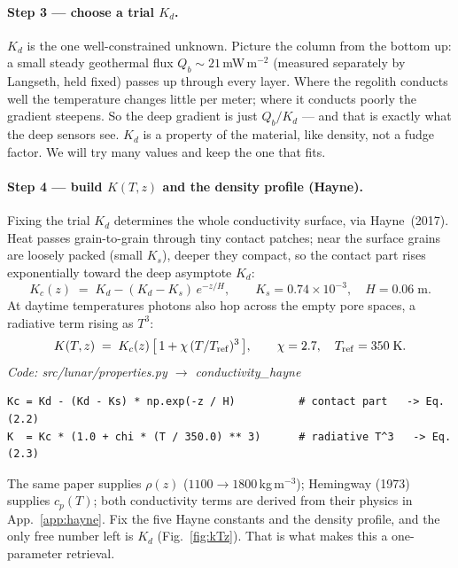 \documentclass[11pt]{report}
\newcommand{\code}[1]{{\ttfamily\small #1}}
\begin{document}
\paragraph{\textbf{Step 3 --- choose a trial $K_d$.}}
$K_d$ is the one well-constrained unknown. Picture the column from the bottom up:
a small steady geothermal flux $Q_b\!\sim\!21$\,mW\,m$^{-2}$ (measured separately
by Langseth, held fixed) passes up through every layer. Where the regolith
conducts well the temperature changes little per meter; where it conducts poorly
the gradient steepens. So the deep gradient is just $Q_b/K_d$ --- and that is
exactly what the deep sensors see. $K_d$ is a property of the material, like
density, not a fudge factor. We will try many values and keep the one that fits.

\paragraph{\textbf{Step 4 --- build $K(T,z)$ and the density profile (Hayne).}}
Fixing the trial $K_d$ determines the whole conductivity surface, via
Hayne~(2017). Heat passes grain-to-grain through tiny contact patches; near the
surface grains are loosely packed (small $K_s$), deeper they compact, so the
contact part rises exponentially toward the deep asymptote $K_d$:
\begin{equation}
K_c(z) \;=\; K_d - (K_d - K_s)\,e^{-z/H},\qquad K_s = 0.74\!\times\!10^{-3},\quad H = 0.06\;\text{m}.
\label{eq:Kc}
\end{equation}
At daytime temperatures photons also hop across the empty pore spaces, a
radiative term rising as $T^3$:
\begin{equation}
K(T,z) \;=\; K_c(z)\,\bigl[\,1 + \chi\,(T/T_{\rm ref})^3\,\bigr],
\qquad \chi = 2.7,\quad T_{\rm ref}=350\;\text{K}.
\label{eq:Khayne}
\end{equation}
{\small\color{dim}\textit{Code: \code{src/lunar/properties.py} $\to$ \code{conductivity\_hayne}}}
\begin{lstlisting}[style=py]
Kc = Kd - (Kd - Ks) * np.exp(-z / H)          # contact part   -> Eq. (2.2)
K  = Kc * (1.0 + chi * (T / 350.0) ** 3)      # radiative T^3   -> Eq. (2.3)
\end{lstlisting}

The same paper supplies $\rho(z)$ ($1100\!\to\!1800$\,kg\,m$^{-3}$); Hemingway
(1973) supplies $c_p(T)$; both conductivity terms are derived from their physics
in App.~\ref{app:hayne}. Fix the five Hayne constants and the density profile,
and the only free number left is $K_d$ (Fig.~\ref{fig:kTz}). That is what makes
this a one-parameter retrieval.
\end{document}
